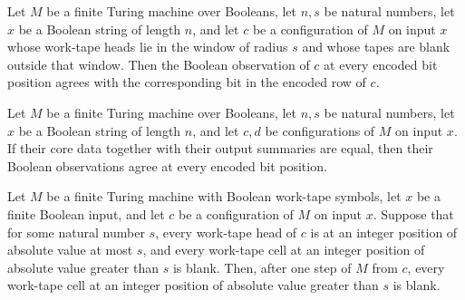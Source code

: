 \begin{theorem}
\label{Complexity.codecObserve_eq}
\leanok
{}
Let $M$ be a finite Turing machine over Booleans, let $n,s$ be natural numbers, let $x$
be a Boolean string of length $n$, and let $c$ be a configuration of $M$ on input $x$
whose work-tape heads lie in the window of radius $s$ and whose tapes are blank outside
that window. Then the Boolean observation of $c$ at every encoded bit position agrees
with the corresponding bit in the encoded row of $c$.
\end{theorem}

\begin{theorem}
\label{Complexity.codecObserve_congr}
\leanok
{}
Let $M$ be a finite Turing machine over Booleans, let $n,s$ be natural numbers, let $x$
be a Boolean string of length $n$, and let $c,d$ be configurations of $M$ on input $x$.
If their core data together with their output summaries are equal, then their Boolean
observations agree at every encoded bit position.
\end{theorem}

\begin{theorem}
\label{Complexity.codec_step_blank}
\leanok
{}
Let $M$ be a finite Turing machine with Boolean work-tape symbols, let $x$ be a finite
Boolean input, and let $c$ be a configuration of $M$ on input $x$. Suppose that for some
natural number $s$, every work-tape head of $c$ is at an integer position of absolute
value at most $s$, and every work-tape cell at an integer position of absolute value
greater than $s$ is blank. Then, after one step of $M$ from $c$, every work-tape cell at
an integer position of absolute value greater than $s$ is blank.
\end{theorem}

